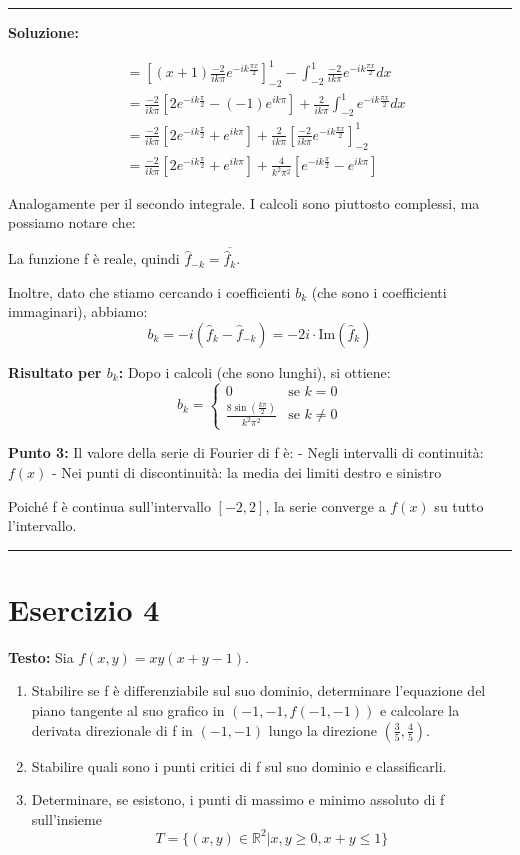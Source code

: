 \documentclass[12pt, a4paper]{article}
\newenvironment{solution}
{\par\noindent\rule{\textwidth}{0.4pt}\par\textbf{Soluzione:}\medskip\par}
{\par\rule{\textwidth}{0.4pt}\par\bigskip}
\begin{document}
\begin{solution}
\begin{align}
&= \left[(x+1) \frac{-2}{ik\pi} e^{-ik\frac{\pi x}{2}}\right]_{-2}^{1} - \int_{-2}^{1} \frac{-2}{ik\pi} e^{-ik\frac{\pi x}{2}} dx \\
&= \frac{-2}{ik\pi} \left[2 e^{-ik\frac{\pi}{2}} - (-1) e^{ik\pi}\right] + \frac{2}{ik\pi} \int_{-2}^{1} e^{-ik\frac{\pi x}{2}} dx \\
&= \frac{-2}{ik\pi} \left[2 e^{-ik\frac{\pi}{2}} + e^{ik\pi}\right] + \frac{2}{ik\pi} \left[\frac{-2}{ik\pi} e^{-ik\frac{\pi x}{2}}\right]_{-2}^{1} \\
&= \frac{-2}{ik\pi} \left[2 e^{-ik\frac{\pi}{2}} + e^{ik\pi}\right] + \frac{4}{k^2\pi^2} \left[e^{-ik\frac{\pi}{2}} - e^{ik\pi}\right]
\end{align}

Analogamente per il secondo integrale. I calcoli sono piuttosto complessi, ma possiamo notare che:

La funzione f è reale, quindi $\hat{f}_{-k} = \overline{\hat{f}_k}$.

Inoltre, dato che stiamo cercando i coefficienti $b_k$ (che sono i coefficienti immaginari), abbiamo:
\[
b_k = -i(\hat{f}_k - \hat{f}_{-k}) = -2i \cdot \text{Im}(\hat{f}_k)
\]

\textbf{Risultato per $b_k$:}
Dopo i calcoli (che sono lunghi), si ottiene:
\[
b_k = \begin{cases}
0 & \text{se } k = 0 \\
\frac{8\sin\left(\frac{k\pi}{2}\right)}{k^2\pi^2} & \text{se } k \neq 0
\end{cases}
\]

\textbf{Punto 3:} Il valore della serie di Fourier di f è:
- Negli intervalli di continuità: $f(x)$
- Nei punti di discontinuità: la media dei limiti destro e sinistro

Poiché f è continua sull'intervallo $[-2, 2]$, la serie converge a $f(x)$ su tutto l'intervallo.
\end{solution}

\newpage

\section*{Esercizio 4}

\textbf{Testo:} Sia $f(x,y) = xy(x+y-1)$.
\begin{enumerate}
    \item Stabilire se f è differenziabile sul suo dominio, determinare l'equazione del piano tangente al suo grafico in $(-1,-1,f(-1,-1))$ e calcolare la derivata direzionale di f in $(-1,-1)$ lungo la direzione $(\frac{3}{5}, \frac{4}{5})$.
    \item Stabilire quali sono i punti critici di f sul suo dominio e classificarli.
    \item Determinare, se esistono, i punti di massimo e minimo assoluto di f sull'insieme
    \[ T = \{(x,y) \in \mathbb{R}^{2} | x,y \ge 0, x+y \le 1\} \]
\end{enumerate}
\end{document}
